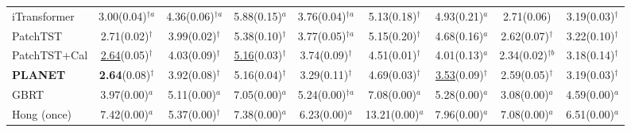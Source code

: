 \begin{table}[!t]
\begin{adjustbox}{max width=\linewidth}
\begin{tabular}{lcccccccc}
iTransformer & 3.00{\scriptsize\color{gray}(0.04)}$^{\dagger{}a}$ & 4.36{\scriptsize\color{gray}(0.06)}$^{\dagger{}a}$ & 5.88{\scriptsize\color{gray}(0.15)}$^{a}$ & 3.76{\scriptsize\color{gray}(0.04)}$^{\dagger{}a}$ & 5.13{\scriptsize\color{gray}(0.18)}$^{\dagger{}}$ & 4.93{\scriptsize\color{gray}(0.21)}$^{a}$ & 2.71{\scriptsize\color{gray}(0.06)} & 3.19{\scriptsize\color{gray}(0.03)}$^{\dagger{}}$ \\
PatchTST & 2.71{\scriptsize\color{gray}(0.02)}$^{\dagger{}}$ & 3.99{\scriptsize\color{gray}(0.02)}$^{\dagger{}}$ & 5.38{\scriptsize\color{gray}(0.10)}$^{\dagger{}}$ & 3.77{\scriptsize\color{gray}(0.05)}$^{\dagger{}a}$ & 5.15{\scriptsize\color{gray}(0.20)}$^{\dagger{}}$ & 4.68{\scriptsize\color{gray}(0.16)}$^{a}$ & 2.62{\scriptsize\color{gray}(0.07)}$^{\dagger{}}$ & 3.22{\scriptsize\color{gray}(0.10)}$^{\dagger{}}$ \\
PatchTST+Cal & \underline{2.64}{\scriptsize\color{gray}(0.05)}$^{\dagger{}}$ & 4.03{\scriptsize\color{gray}(0.09)}$^{\dagger{}}$ & \underline{5.16}{\scriptsize\color{gray}(0.03)}$^{\dagger{}}$ & 3.74{\scriptsize\color{gray}(0.09)}$^{\dagger{}}$ & 4.51{\scriptsize\color{gray}(0.01)}$^{\dagger{}}$ & 4.01{\scriptsize\color{gray}(0.13)}$^{a}$ & 2.34{\scriptsize\color{gray}(0.02)}$^{\dagger{}b}$ & 3.18{\scriptsize\color{gray}(0.14)}$^{\dagger{}}$ \\
\textbf{PLANET} & \textbf{2.64}{\scriptsize\color{gray}(0.08)}$^{\dagger{}}$ & 3.92{\scriptsize\color{gray}(0.08)}$^{\dagger{}}$ & 5.16{\scriptsize\color{gray}(0.04)}$^{\dagger{}}$ & 3.29{\scriptsize\color{gray}(0.11)}$^{\dagger{}}$ & 4.69{\scriptsize\color{gray}(0.03)}$^{\dagger{}}$ & \underline{3.53}{\scriptsize\color{gray}(0.09)}$^{\dagger{}}$ & 2.59{\scriptsize\color{gray}(0.05)}$^{\dagger{}}$ & 3.19{\scriptsize\color{gray}(0.03)}$^{\dagger{}}$ \\
GBRT & 3.97{\scriptsize\color{gray}(0.00)}$^{a}$ & 5.11{\scriptsize\color{gray}(0.00)}$^{a}$ & 7.05{\scriptsize\color{gray}(0.00)}$^{a}$ & 5.24{\scriptsize\color{gray}(0.00)}$^{\dagger{}a}$ & 7.08{\scriptsize\color{gray}(0.00)}$^{a}$ & 5.28{\scriptsize\color{gray}(0.00)}$^{a}$ & 3.08{\scriptsize\color{gray}(0.00)}$^{a}$ & 4.59{\scriptsize\color{gray}(0.00)}$^{a}$ \\
Hong (once) & 7.42{\scriptsize\color{gray}(0.00)}$^{a}$ & 5.37{\scriptsize\color{gray}(0.00)}$^{\dagger{}}$ & 7.38{\scriptsize\color{gray}(0.00)}$^{a}$ & 6.23{\scriptsize\color{gray}(0.00)}$^{a}$ & 13.21{\scriptsize\color{gray}(0.00)}$^{a}$ & 7.96{\scriptsize\color{gray}(0.00)}$^{a}$ & 7.08{\scriptsize\color{gray}(0.00)}$^{a}$ & 6.51{\scriptsize\color{gray}(0.00)}$^{a}$ \\

\end{tabular}
\end{adjustbox}
\end{table}
